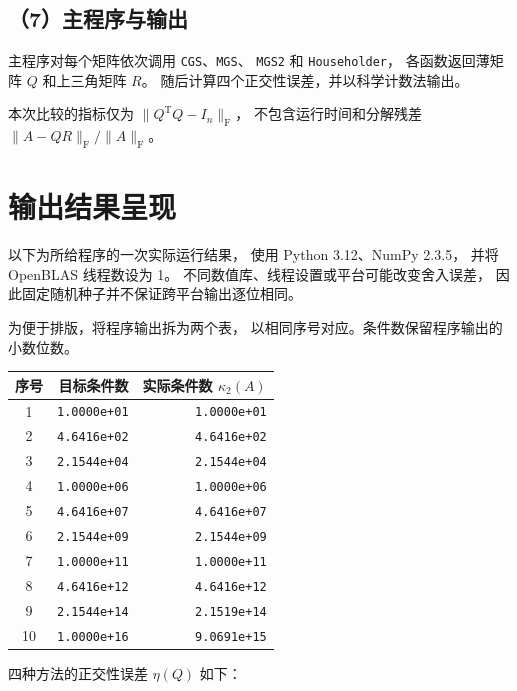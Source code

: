 \documentclass[UTF8,a4paper,11pt,fontset=fandol]{ctexart}
\begin{document}
\subsection*{（7）主程序与输出}

主程序对每个矩阵依次调用
\texttt{CGS}、\texttt{MGS}、
\texttt{MGS2} 和 \texttt{Householder}，
各函数返回薄矩阵 $Q$ 和上三角矩阵 $R$。
随后计算四个正交性误差，并以科学计数法输出。

本次比较的指标仅为
$\|Q^{\mathrm T}Q-I_n\|_{\mathrm F}$，
不包含运行时间和分解残差
$\|A-QR\|_{\mathrm F}/\|A\|_{\mathrm F}$。

\section{输出结果呈现}

以下为所给程序的一次实际运行结果，
使用 Python 3.12、NumPy 2.3.5，
并将 OpenBLAS 线程数设为 1。
不同数值库、线程设置或平台可能改变舍入误差，
因此固定随机种子并不保证跨平台输出逐位相同。

为便于排版，将程序输出拆为两个表，
以相同序号对应。条件数保留程序输出的小数位数。

\begin{center}
\small
\begin{tabular}{crr}
\toprule
序号 & 目标条件数 & 实际条件数 $\kappa_2(A)$\\
\midrule
1  & \texttt{1.0000e+01} & \texttt{1.0000e+01}\\
2  & \texttt{4.6416e+02} & \texttt{4.6416e+02}\\
3  & \texttt{2.1544e+04} & \texttt{2.1544e+04}\\
4  & \texttt{1.0000e+06} & \texttt{1.0000e+06}\\
5  & \texttt{4.6416e+07} & \texttt{4.6416e+07}\\
6  & \texttt{2.1544e+09} & \texttt{2.1544e+09}\\
7  & \texttt{1.0000e+11} & \texttt{1.0000e+11}\\
8  & \texttt{4.6416e+12} & \texttt{4.6416e+12}\\
9  & \texttt{2.1544e+14} & \texttt{2.1519e+14}\\
10 & \texttt{1.0000e+16} & \texttt{9.0691e+15}\\
\bottomrule
\end{tabular}
\end{center}

四种方法的正交性误差 $\eta(Q)$ 如下：
\end{document}
